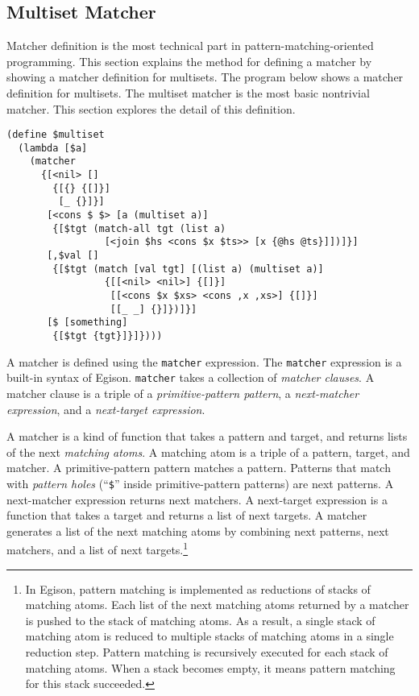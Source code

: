 \documentclass{article}
\begin{document}
\subsection{Multiset Matcher}\label{multiset}

Matcher definition is the most technical part in pattern-matching-oriented programming.
This section explains the method for defining a matcher by showing a matcher definition for multisets.
The program below shows a matcher definition for multisets.
The multiset matcher is the most basic nontrivial matcher.
This section explores the detail of this definition.

\begin{lstlisting}[language=egison]
(define $multiset
  (lambda [$a]
    (matcher
      {[<nil> []
        {[{} {[]}]
         [_ {}]}]
       [<cons $ $> [a (multiset a)]
        {[$tgt (match-all tgt (list a)
                 [<join $hs <cons $x $ts>> [x {@hs @ts}]])]}]
       [,$val []
        {[$tgt (match [val tgt] [(list a) (multiset a)]
                 {[[<nil> <nil>] {[]}]
                  [[<cons $x $xs> <cons ,x ,xs>] {[]}]
                  [[_ _] {}]})]}]
       [$ [something]
        {[$tgt {tgt}]}]})))
\end{lstlisting}

A matcher is defined using the \texttt{matcher} expression.
The \texttt{matcher} expression is a built-in syntax of Egison.
\texttt{matcher} takes a collection of \emph{matcher clauses}.
A matcher clause is a triple of a \emph{primitive-pattern pattern}, a \emph{next-matcher expression}, and a \emph{next-target expression}.

A matcher is a kind of function that takes a pattern and target, and returns lists of the next \emph{matching atoms}.
A matching atom is a triple of a pattern, target, and matcher.
A primitive-pattern pattern matches a pattern.
Patterns that match with \emph{pattern holes} (``\verb|$|'' inside primitive-pattern patterns) are next patterns.
A next-matcher expression returns next matchers.
A next-target expression is a function that takes a target and returns a list of next targets.
A matcher generates a list of the next matching atoms by combining next patterns, next matchers, and a list of next targets.\footnote{In Egison, pattern matching is implemented as reductions of stacks of matching atoms.
Each list of the next matching atoms returned by a matcher is pushed to the stack of matching atoms.
As a result, a single stack of matching atom is reduced to multiple stacks of matching atoms in a single reduction step.
Pattern matching is recursively executed for each stack of matching atoms.
When a stack becomes empty, it means pattern matching for this stack succeeded.}
\end{document}
